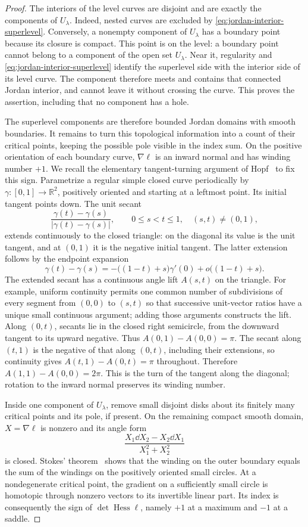 \begin{proof}
The interiors of the level curves are disjoint and are exactly the
components of $U_\lambda$.  Indeed, nested curves are excluded by
\eqref{eq:jordan-interior-superlevel}.  Conversely, a nonempty component
of $U_\lambda$ has a boundary point because its closure is compact.
This point is on the level: a boundary point cannot belong to a component
of the open set $U_\lambda$.  Near it, regularity and
\eqref{eq:jordan-interior-superlevel} identify the superlevel side with
the interior side of its level curve.  The component therefore meets and
contains that connected Jordan interior, and cannot leave it without
crossing the curve.  This proves the assertion, including that no
component has a hole.

The superlevel components are therefore bounded Jordan domains with smooth boundaries.
It remains to turn this topological information into a count of their
critical points, keeping the possible pole visible in the index sum.
On the positive orientation of each boundary curve, $\nabla\ell$ is an
inward normal and has winding number $+1$.  We recall the elementary
tangent-turning argument of Hopf~\cite[\S2, pp.~53--55]{Hopf1935} to fix this sign.
Parametrize a regular simple closed curve periodically by
$\gamma:[0,1]\to\mathbb R^2$, positively oriented and starting at a
leftmost point.  Its initial tangent points down.  The unit secant
\[
 \frac{\gamma(t)-\gamma(s)}{|\gamma(t)-\gamma(s)|},
 \qquad 0\le s<t\le1,\quad(s,t)\ne(0,1),
\]
extends continuously to the closed triangle: on the diagonal its value
is the unit tangent, and at $(0,1)$ it is the negative initial tangent.
The latter extension follows by the endpoint expansion
\[
 \gamma(t)-\gamma(s)
 =-\bigl((1-t)+s\bigr)\gamma'(0)
   +o\bigl((1-t)+s\bigr).
\]
The extended secant has a continuous angle lift $A(s,t)$ on the triangle.
For example, uniform continuity permits one common number of subdivisions
of every segment from $(0,0)$ to $(s,t)$ so that successive unit-vector
ratios have a unique small continuous argument; adding those arguments
constructs the lift.  Along $(0,t)$, secants lie in the closed right
semicircle, from the downward tangent to its upward negative.  Thus
$A(0,1)-A(0,0)=\pi$.  The secant along $(t,1)$ is the negative of that
along $(0,t)$, including their extensions, so continuity gives
$A(t,1)-A(0,t)=\pi$ throughout.  Therefore
$A(1,1)-A(0,0)=2\pi$.  This is the turn of the tangent along the diagonal;
rotation to the inward normal preserves its winding number.

Inside one component of $U_\lambda$, remove small disjoint disks about its
finitely many critical points and its pole, if present.  On the remaining
compact smooth domain, $X=\nabla\ell$ is nonzero and its angle form
\[
 \frac{X_1\dd X_2-X_2\dd X_1}{X_1^2+X_2^2}
\]
is closed.  Stokes' theorem~\cite[Theorem~16.11]{Lee2013} shows that the
winding on the outer boundary equals the sum of the windings on the
positively oriented small circles.  At a nondegenerate critical point,
the gradient on a sufficiently small circle is homotopic through
nonzero vectors to its invertible linear part.  Its index is consequently
the sign of $\det\operatorname{Hess}\ell$, namely $+1$ at a maximum and
$-1$ at a saddle.


\end{proof}
